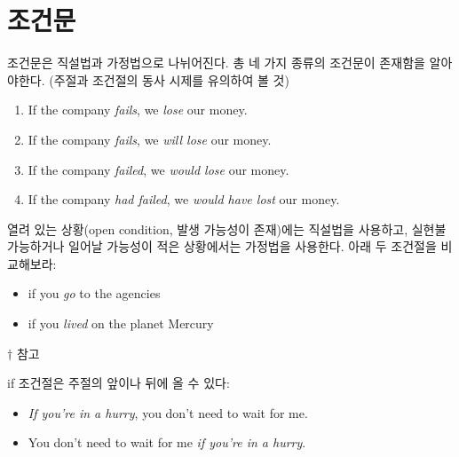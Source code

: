 \documentclass[ a4paper]{oblivoir}
\begin{document}
    \chapter*{\Huge 조건문}
    
    조건문은 직설법과 가정법으로 나뉘어진다. 
    총 네 가지 종류의 조건문이 존재함을 알아야한다. (주절과 조건절의 동사 시제를 유의하여 볼 것)
    \begin{enumerate}
        \item If the company \emph{fails}, we \emph{lose} our money. 
        \item If the company \emph{fails}, we \emph{will lose} our money. 
        \item If the company \emph{failed}, we \emph{would lose} our money. 
        \item If the company \emph{had failed}, we \emph{would have lost} our money. 
    \end{enumerate}

    
    열려 있는 상황(open condition, 발생 가능성이 존재)에는 직설법을 사용하고, 실현불가능하거나 일어날 가능성이 적은 상황에서는
    가정법을 사용한다. 아래 두 조건절을 비교해보라: 
    \begin{itemize}
        \item if you \emph{go} to the agencies
        \item if you \emph{lived} on the planet Mercury
    \end{itemize}

    
    {\footnotesize{$\dagger$ 참고 

    if 조건절은 주절의 앞이나 뒤에 올 수 있다:
    \begin{itemize}
        \item \emph{If you're in a hurry}, you don't need to wait for me.
        \item You don't need to wait for me \emph{if you're in a hurry}.
    \end{itemize}
    }}

\end{document}
